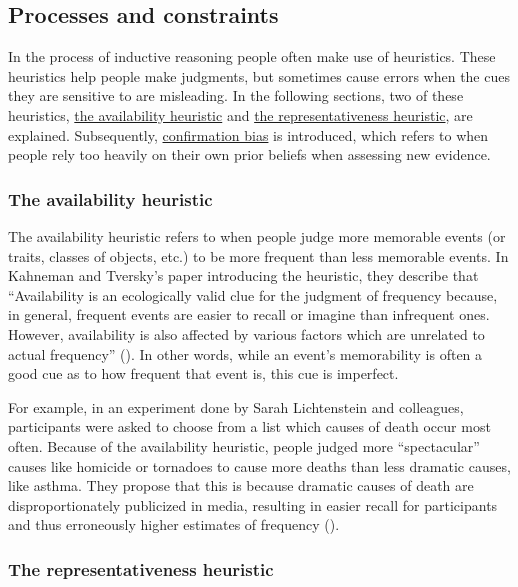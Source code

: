 \documentclass[
]{krantz}
\begin{document}
\subsection*{Processes and constraints}\label{processes-and-constraints}


In the process of inductive reasoning people often make use of heuristics. These heuristics help people make judgments, but sometimes cause errors when the cues they are sensitive to are misleading. In the following sections, two of these heuristics, \hyperref[the-availability-heuristic]{the availability heuristic} and \hyperref[the-representativeness-heuristic]{the representativeness heuristic}, are explained. Subsequently, \hyperref[confirmation-bias]{confirmation bias} is introduced, which refers to when people rely too heavily on their own prior beliefs when assessing new evidence.

\subsubsection*{The availability heuristic}\label{the-availability-heuristic}


The availability heuristic refers to when people judge more memorable events (or traits, classes of objects, etc.) to be more frequent than less memorable events. In Kahneman and Tversky's paper introducing the heuristic, they describe that ``Availability is an ecologically valid clue for the judgment of frequency because, in general, frequent events are easier to recall or imagine than infrequent ones. However, availability is also affected by various factors which are unrelated to actual frequency'' (). In other words, while an event's memorability is often a good cue as to how frequent that event is, this cue is imperfect.

For example, in an experiment done by Sarah Lichtenstein and colleagues, participants were asked to choose from a list which causes of death occur most often. Because of the availability heuristic, people judged more ``spectacular'' causes like homicide or tornadoes to cause more deaths than less dramatic causes, like asthma. They propose that this is because dramatic causes of death are disproportionately publicized in media, resulting in easier recall for participants and thus erroneously higher estimates of frequency ().

\subsubsection*{The representativeness heuristic}\label{the-representativeness-heuristic}
\end{document}
